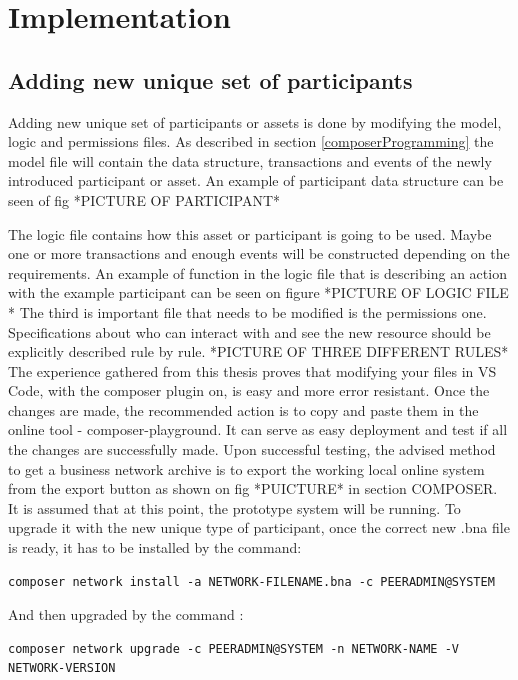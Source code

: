 \documentclass[a4paper,11pt]{report}
\begin{document}
\section{Implementation}
\subsection{Adding new unique set of participants}
Adding new unique set of participants or assets is done by modifying the model, logic and permissions files. As described in section \ref{composerProgramming} the model file will contain the data structure, transactions and events of the newly introduced participant or asset. An example of participant data structure can be seen of fig 
*PICTURE OF PARTICIPANT*

The logic file contains how this asset or participant is going to be used. Maybe one or more transactions and enough events will be constructed depending on the requirements. An example of function in the logic file that is describing an action with the example participant can be seen on figure 
*PICTURE OF LOGIC FILE *  
	The third is important file that needs to be modified is the permissions one. Specifications about who can interact with and see the new resource should be explicitly described rule by rule. 
*PICTURE OF THREE DIFFERENT RULES*
	The experience gathered from this thesis proves that modifying your files in VS Code, with the composer plugin on, is easy and more error resistant. Once the changes are made, the recommended action is to copy and paste them in the online tool - composer-playground. It can serve as easy deployment and test if all the changes are successfully made. 
	Upon successful testing, the advised method to get a business network archive is to export the working local online system from the export button as shown on fig *PUICTURE* in section COMPOSER.
	It is assumed that at this point, the prototype system will be running. To upgrade it with the new unique type of participant, once the correct new .bna file is ready, it has to be installed by the command:
\begin{verbatim}
composer network install -a NETWORK-FILENAME.bna -c PEERADMIN@SYSTEM
\end{verbatim}
	

	And then upgraded by the command : 
\begin{verbatim}
composer network upgrade -c PEERADMIN@SYSTEM -n NETWORK-NAME -V NETWORK-VERSION
\end{verbatim}
\end{document}
